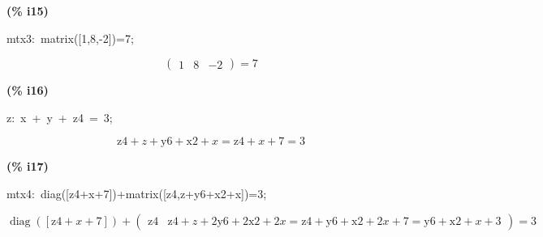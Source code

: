 \documentclass[fleqn]{article}
\begin{document}
\noindent
\begin{minipage}[t]{4.000000em}\color{red}\bfseries
(\% i15)	
\end{minipage}
\begin{minipage}[t]{\textwidth}\color{blue}
mtx3:\ matrix([1,8,-2])=7;
\end{minipage}
\[\displaystyle \tag{mtx3} 
\begin{pmatrix}1 & 8 & \mathop{-}2\end{pmatrix}\mathop{=}7\mbox{}
\]


\noindent
\begin{minipage}[t]{4.000000em}\color{red}\bfseries
(\% i16)	
\end{minipage}
\begin{minipage}[t]{\textwidth}\color{blue}
z:\ x\ +\ y\ +\ z4\ =\ 3;\ 
\end{minipage}
\[\displaystyle \tag{z} 
\ensuremath{\mathrm{z4}}\mathop{+}z\mathop{+}\ensuremath{\mathrm{y6}}\mathop{+}\ensuremath{\mathrm{x2}}\mathop{+}x\mathop{=}\ensuremath{\mathrm{z4}}\mathop{+}x\mathop{+}7\mathop{=}3\mbox{}
\]


\noindent
\begin{minipage}[t]{4.000000em}\color{red}\bfseries
(\% i17)	
\end{minipage}
\begin{minipage}[t]{\textwidth}\color{blue}
mtx4:\ diag([z4+x+7])+matrix([z4,z+y6+x2+x])=3;
\end{minipage}
\[\displaystyle \tag{mtx4} 
\mathop{diag}\left( \left[ \ensuremath{\mathrm{z4}}\mathop{+}x\mathop{+}7\right] \right) \mathop{+}\begin{pmatrix}\ensuremath{\mathrm{z4}} & \ensuremath{\mathrm{z4}}\mathop{+}z\mathop{+}2 \ensuremath{\mathrm{y6}}\mathop{+}2 \ensuremath{\mathrm{x2}}\mathop{+}2 x\mathop{=}\ensuremath{\mathrm{z4}}\mathop{+}\ensuremath{\mathrm{y6}}\mathop{+}\ensuremath{\mathrm{x2}}\mathop{+}2 x\mathop{+}7\mathop{=}\ensuremath{\mathrm{y6}}\mathop{+}\ensuremath{\mathrm{x2}}\mathop{+}x\mathop{+}3\end{pmatrix}\mathop{=}3\mbox{}
\]
\end{document}
